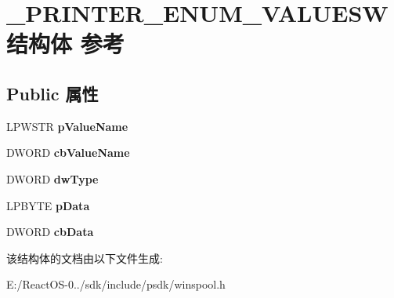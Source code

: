 \hypertarget{struct___p_r_i_n_t_e_r___e_n_u_m___v_a_l_u_e_s_w}{}\section{\+\_\+\+P\+R\+I\+N\+T\+E\+R\+\_\+\+E\+N\+U\+M\+\_\+\+V\+A\+L\+U\+E\+S\+W结构体 参考}
\label{struct___p_r_i_n_t_e_r___e_n_u_m___v_a_l_u_e_s_w}
\subsection*{Public 属性}
\begin{DoxyCompactItemize}
\item 
\mbox{\label{struct___p_r_i_n_t_e_r___e_n_u_m___v_a_l_u_e_s_w_a1e663b251b9af6d11aa935e68f8cc4a9}} 
L\+P\+W\+S\+TR {\bfseries p\+Value\+Name}
\item 
\mbox{\label{struct___p_r_i_n_t_e_r___e_n_u_m___v_a_l_u_e_s_w_af75a577de0aea3efa5cff075a96b911a}} 
D\+W\+O\+RD {\bfseries cb\+Value\+Name}
\item 
\mbox{\label{struct___p_r_i_n_t_e_r___e_n_u_m___v_a_l_u_e_s_w_a56fda966a68d2eefeb76972133ffad15}} 
D\+W\+O\+RD {\bfseries dw\+Type}
\item 
\mbox{\label{struct___p_r_i_n_t_e_r___e_n_u_m___v_a_l_u_e_s_w_a0197430bd5814a4b5078918d1cd229b9}} 
L\+P\+B\+Y\+TE {\bfseries p\+Data}
\item 
\mbox{\label{struct___p_r_i_n_t_e_r___e_n_u_m___v_a_l_u_e_s_w_ae03b156f1868e5ad1e9a2850ea4b1bdc}} 
D\+W\+O\+RD {\bfseries cb\+Data}
\end{DoxyCompactItemize}


该结构体的文档由以下文件生成\+:\begin{DoxyCompactItemize}
\item 
E\+:/\+React\+O\+S-\/0../sdk/include/psdk/winspool.\+h\end{DoxyCompactItemize}
